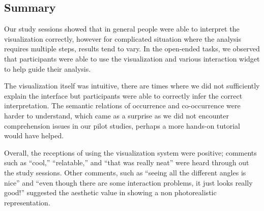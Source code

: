   
\subsection{Summary}
Our study sessions showed that in general people were able to interpret the
visualization correctly, however for complicated situation where the analysis
requires multiple steps, results tend to vary. In the open-ended tasks, we
observed that participants were able to use the visualization and various
interaction widget to help guide their analysis.

The visualization itself was intuitive, there are times where we did not
sufficiently explain the interface but participants were able to correctly infer
the correct interpretation. The semantic relations of occurrence and
co-occurrence were harder to understand, which came as a surprise as we did not
encounter comprehension issues in our pilot studies, perhaps a more hands-on
tutorial would have helped.

Overall, the receptions of using the visualization system were positive;
comments such as ``cool,'' ``relatable,'' and ``that was really neat'' were heard
through out the study sessions. Other comments, such as ``seeing all the different angles is
nice'' and ``even though there are some interaction problems, it just looks
really good!'' suggested the aesthetic value in showing a non photorealistic \threed
representation.  
  